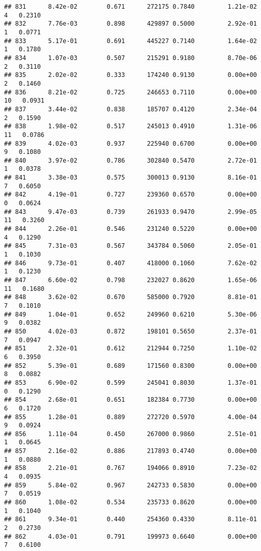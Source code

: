 \documentclass[
]{article}
\begin{document}
\begin{verbatim}
## 831      8.42e-02        0.671      272175 0.7840         1.21e-02   4   0.2310
## 832      7.76e-03        0.898      429897 0.5000         2.92e-01   1   0.0771
## 833      5.17e-01        0.691      445227 0.7140         1.64e-02   1   0.1780
## 834      1.07e-03        0.507      215291 0.9180         8.70e-06   2   0.3110
## 835      2.02e-02        0.333      174240 0.9130         0.00e+00   2   0.1460
## 836      8.21e-02        0.725      246653 0.7110         0.00e+00  10   0.0931
## 837      3.44e-02        0.838      185707 0.4120         2.34e-04   2   0.1590
## 838      1.98e-02        0.517      245013 0.4910         1.31e-06  11   0.0786
## 839      4.02e-03        0.937      225940 0.6700         0.00e+00   9   0.1080
## 840      3.97e-02        0.786      302840 0.5470         2.72e-01   1   0.0378
## 841      3.38e-03        0.575      300013 0.9130         8.16e-01   7   0.6050
## 842      4.19e-01        0.727      239360 0.6570         0.00e+00   0   0.0624
## 843      9.47e-03        0.739      261933 0.9470         2.99e-05  11   0.3260
## 844      2.26e-01        0.546      231240 0.5220         0.00e+00   4   0.1290
## 845      7.31e-03        0.567      343784 0.5060         2.05e-01   1   0.1030
## 846      9.73e-01        0.407      418000 0.1060         7.62e-02   1   0.1230
## 847      6.60e-02        0.798      232027 0.8620         1.65e-06  11   0.1680
## 848      3.62e-02        0.670      585000 0.7920         8.81e-01   7   0.1010
## 849      1.04e-01        0.652      249960 0.6210         5.30e-06   9   0.0382
## 850      4.02e-03        0.872      198101 0.5650         2.37e-01   7   0.0947
## 851      2.32e-01        0.612      212944 0.7250         1.10e-02   6   0.3950
## 852      5.39e-01        0.689      171560 0.8300         0.00e+00   8   0.0882
## 853      6.90e-02        0.599      245041 0.8030         1.37e-01   0   0.1290
## 854      2.68e-01        0.651      182384 0.7730         0.00e+00   6   0.1720
## 855      1.28e-01        0.889      272720 0.5970         4.00e-04   9   0.0924
## 856      1.11e-04        0.450      267000 0.9860         2.51e-01   1   0.0645
## 857      2.16e-02        0.886      217893 0.4740         0.00e+00   1   0.0880
## 858      2.21e-01        0.767      194066 0.8910         7.23e-02   4   0.0935
## 859      5.84e-02        0.967      242733 0.5830         0.00e+00   7   0.0519
## 860      1.08e-02        0.534      235733 0.8620         0.00e+00   1   0.1040
## 861      9.34e-01        0.440      254360 0.4330         8.11e-01   2   0.2730
## 862      4.03e-01        0.791      199973 0.6640         0.00e+00   7   0.6100

\end{verbatim}
\end{document}

